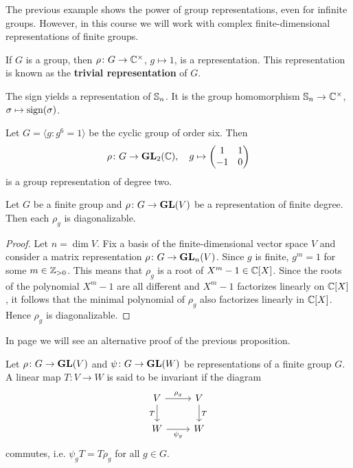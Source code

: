The previous example shows the power of group representations, even for infinite groups.   
However, in this course we will work with complex finite-dimensional 
representations of finite
groups.  

\begin{example}
	If $G$ is a group, then $\rho\colon G\to\mathbb{C}^\times$, $g\mapsto 1$, is a representation. This representation is known as the \textbf{trivial representation} of $G$. 	
\end{example}

\begin{example}
	The sign yields a representation of $\mathbb{S}_n$. It is the group homomorphism
	$\mathbb{S}_n\to\mathbb{C}^\times$, $\sigma\mapsto\operatorname{sign}(\sigma)$.  	
\end{example}


\begin{example}
	Let $G=\langle g:g^6=1\rangle$ be the cyclic group of order six. Then
	\[
	\rho\colon G\to\mathbf{GL}_2(\mathbb{C}),
	\quad 
	g\mapsto\begin{pmatrix}1&1\\-1&0\end{pmatrix}
	\] 
	is a group representation of degree two. 
\end{example}

\begin{proposition}
    Let $G$ be a finite group and $\rho\colon G\to\mathbf{GL}(V)$ be a representation of finite degree. Then
    each $\rho_g$ is diagonalizable.
\end{proposition}

\begin{proof}
    Let $n=\dim V$. Fix a basis of the finite-dimensional vector space $V$ and consider
    a matrix representation $\rho\colon G\to\mathbf{GL}_n(V)$.
	Since $g$ is finite, $g^m=1$ for some $m\in\mathbb{Z}_{>0}$. This means that $\rho_g$ is a root of $X^m-1\in\mathbb{C}[X]$. Since
    the roots of the polynomial $X^m-1$ are all different and $X^m-1$ factorizes linearly on $\mathbb{C}[X]$, it follows
    that the minimal polynomial of $\rho_g$ also factorizes linearly in $\mathbb{C}[X]$. Hence $\rho_g$ is diagonalizable.
\end{proof}

In page \pageref{rho_diagonalizable} we will see an alternative  
proof of the previous proposition. 

\begin{definition}
    Let $\rho\colon G\to\mathbf{GL}(V)$ and $\psi\colon G\to\mathbf{GL}(W)$ be
    representations of a finite group $G$. A linear map $T\colon V\to W$ is said to be invariant
    if the diagram
    \[\begin{tikzcd}
	V & V \\
	W & W
	\arrow["{\rho_g}", from=1-1, to=1-2]
	\arrow["T"', from=1-1, to=2-1]
	\arrow["{\psi_g}"', from=2-1, to=2-2]
	\arrow["T", from=1-2, to=2-2]
\end{tikzcd}\]
    commutes, i.e. $\psi_gT=T\rho_g$ for all $g\in G$.
\end{definition}

